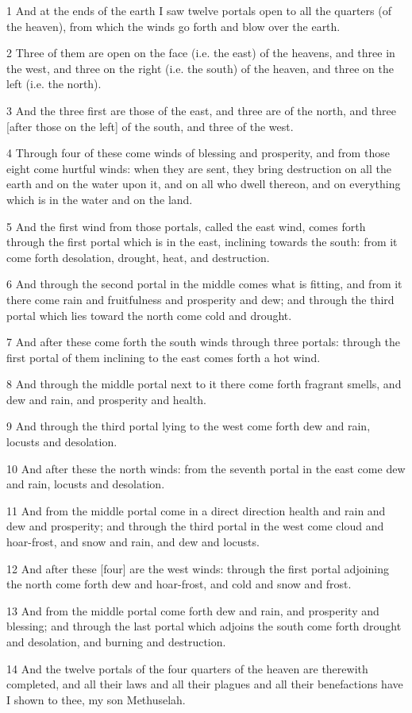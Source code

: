 \par 1 And at the ends of the earth I saw twelve portals open to all the quarters (of the heaven), from which the winds go forth and blow over the earth.
\par 2 Three of them are open on the face (i.e. the east) of the heavens, and three in the west, and three on the right (i.e. the south) of the heaven, and three on the left (i.e. the north).
\par 3 And the three first are those of the east, and three are of the north, and three [after those on the left] of the south, and three of the west.
\par 4 Through four of these come winds of blessing and prosperity, and from those eight come hurtful winds: when they are sent, they bring destruction on all the earth and on the water upon it, and on all who dwell thereon, and on everything which is in the water and on the land.
\par 5 And the first wind from those portals, called the east wind, comes forth through the first portal which is in the east, inclining towards the south: from it come forth desolation, drought, heat, and destruction.
\par 6 And through the second portal in the middle comes what is fitting, and from it there come rain and fruitfulness and prosperity and dew; and through the third portal which lies toward the north come cold and drought.
\par 7 And after these come forth the south winds through three portals: through the first portal of them inclining to the east comes forth a hot wind.
\par 8 And through the middle portal next to it there come forth fragrant smells, and dew and rain, and prosperity and health.
\par 9 And through the third portal lying to the west come forth dew and rain, locusts and desolation.
\par 10 And after these the north winds: from the seventh portal in the east come dew and rain, locusts and desolation.
\par 11 And from the middle portal come in a direct direction health and rain and dew and prosperity; and through the third portal in the west come cloud and hoar-frost, and snow and rain, and dew and locusts.
\par 12 And after these [four] are the west winds: through the first portal adjoining the north come forth dew and hoar-frost, and cold and snow and frost.
\par 13 And from the middle portal come forth dew and rain, and prosperity and blessing; and through the last portal which adjoins the south come forth drought and desolation, and burning and destruction.
\par 14 And the twelve portals of the four quarters of the heaven are therewith completed, and all their laws and all their plagues and all their benefactions have I shown to thee, my son Methuselah.

